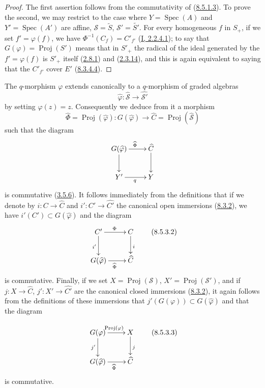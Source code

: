 \begin{proof}
The first assertion follows from the commutativity of
(\hyperref[II.8.5.1.3]{8.5.1.3}). To prove the second, we may
restrict to the case where $Y=\operatorname{Spec}(A)$ and
$Y'=\operatorname{Spec}(A')$ are affine,
$\mathcal{S}=\widetilde{S}$, $\mathcal{S}'=\widetilde{S'}$. For every
homogeneous $f$ in $S_+$, if we set $f'=\varphi(f)$, we have
$\Phi^{-1}(C_f)=C'_{f'}$ (\hyperref[I.2.2.4.1]{I, 2.2.4.1}); to say that
$G(\varphi)=\operatorname{Proj}(S')$ means that in $S'_+$ the radical of
the ideal generated by the $f'=\varphi(f)$ is $S'_+$ itself
(\hyperref[II.2.8.1]{2.8.1}) and (\hyperref[II.2.3.14]{2.3.14}), and this
is again equivalent to saying that the $C'_{f'}$ cover $E'$
(\hyperref[II.8.3.4.4]{8.3.4.4}).
\end{proof}

\begin{env}[8.5.3]
\label{II.8.5.3}
The $q$-morphism $\varphi$ extends canonically to a $q$-morphism
of graded algebras
\begin{equation}
\label{II.8.5.3.1}
  \widehat{\varphi}:\widehat{\mathcal{S}}
  \to\widehat{\mathcal{S}'}
\tag{8.5.3.1}
\end{equation}
by setting $\widehat{\varphi}(z)=z$. Consequently we deduce from it a morphism
\[
  \widehat{\Phi}=\operatorname{Proj}(\widehat{\varphi}):
  G(\widehat{\varphi})\to\widehat{C}
  =\operatorname{Proj}(\widehat{\mathcal{S}})
\]
such that the diagram
\[
  \xymatrix{
    G(\widehat{\varphi})\ar[r]^{\widehat{\Phi}}\ar[d] &
    \widehat{C}\ar[d]\\
    Y'\ar[r]_{q} & Y
  }
\]
is commutative (\hyperref[II.3.5.6]{3.5.6}). It follows immediately from the
definitions that if we denote by $i:C\to\widehat{C}$ and
$i':C'\to\widehat{C'}$ the canonical open immersions
(\hyperref[II.8.3.2]{8.3.2}), we have
$i'(C')\subset G(\widehat{\varphi})$ and the diagram
\begin{equation}
\label{II.8.5.3.2}
  \xymatrix{
    C'\ar[r]^{\Phi}\ar[d]_{i'} & C\ar[d]^{i}\\
    G(\widehat{\varphi})\ar[r]_{\widehat{\Phi}} & \widehat{C}
  }
\tag{8.5.3.2}
\end{equation}
is commutative. Finally, if we set
$X=\operatorname{Proj}(\mathcal{S})$, $X'=\operatorname{Proj}(\mathcal{S}')$,
and if $j:X\to\widehat{C}$, $j':X'\to\widehat{C'}$ are the canonical closed
immersions (\hyperref[II.8.3.2]{8.3.2}), it again follows from the
definitions of these immersions that
$j'(G(\varphi))\subset G(\widehat{\varphi})$ and that the diagram

\begin{equation}
\label{II.8.5.3.3}
  \xymatrix{
    G(\varphi)\ar[r]^{\operatorname{Proj}(\varphi)}\ar[d]_{j'} &
    X\ar[d]^{j}\\
    G(\widehat{\varphi})\ar[r]_{\widehat{\Phi}} & \widehat{C}
  }
\tag{8.5.3.3}
\end{equation}
is commutative.
\end{env}


